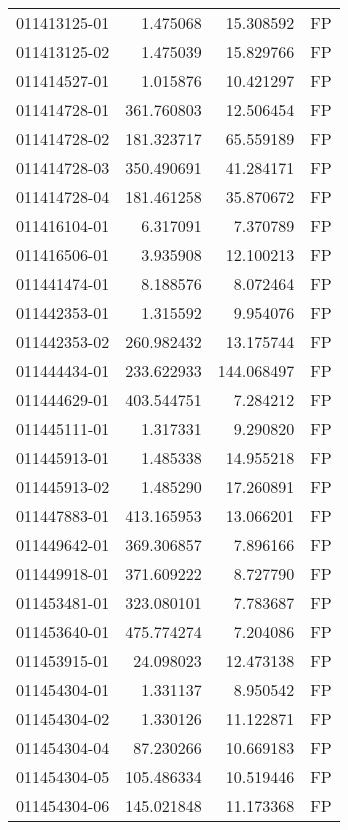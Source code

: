 \begin{tabular}{lrrl}
011413125-01 &    1.475068 &      15.308592 &   FP \\
011413125-02 &    1.475039 &      15.829766 &   FP \\
011414527-01 &    1.015876 &      10.421297 &   FP \\
011414728-01 &  361.760803 &      12.506454 &   FP \\
011414728-02 &  181.323717 &      65.559189 &   FP \\
011414728-03 &  350.490691 &      41.284171 &   FP \\
011414728-04 &  181.461258 &      35.870672 &   FP \\
011416104-01 &    6.317091 &       7.370789 &   FP \\
011416506-01 &    3.935908 &      12.100213 &   FP \\
011441474-01 &    8.188576 &       8.072464 &   FP \\
011442353-01 &    1.315592 &       9.954076 &   FP \\
011442353-02 &  260.982432 &      13.175744 &   FP \\
011444434-01 &  233.622933 &     144.068497 &   FP \\
011444629-01 &  403.544751 &       7.284212 &   FP \\
011445111-01 &    1.317331 &       9.290820 &   FP \\
011445913-01 &    1.485338 &      14.955218 &   FP \\
011445913-02 &    1.485290 &      17.260891 &   FP \\
011447883-01 &  413.165953 &      13.066201 &   FP \\
011449642-01 &  369.306857 &       7.896166 &   FP \\
011449918-01 &  371.609222 &       8.727790 &   FP \\
011453481-01 &  323.080101 &       7.783687 &   FP \\
011453640-01 &  475.774274 &       7.204086 &   FP \\
011453915-01 &   24.098023 &      12.473138 &   FP \\
011454304-01 &    1.331137 &       8.950542 &   FP \\
011454304-02 &    1.330126 &      11.122871 &   FP \\
011454304-04 &   87.230266 &      10.669183 &   FP \\
011454304-05 &  105.486334 &      10.519446 &   FP \\
011454304-06 &  145.021848 &      11.173368 &   FP \\

\end{tabular}
